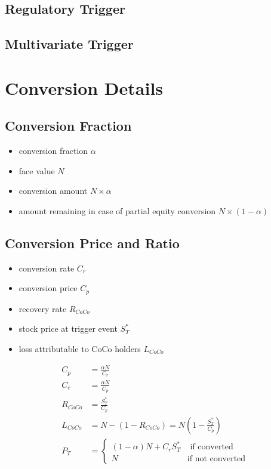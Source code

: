 \subsection{Regulatory Trigger}

\subsection{Multivariate Trigger}

\section{Conversion Details}

\subsection{Conversion Fraction}

\begin{itemize}
    \item conversion fraction $\alpha$
    \item face value $N$
    \item conversion amount $N \times \alpha$
    \item amount remaining in case of partial equity conversion $N \times (1-\alpha)$
\end{itemize}

\subsection{Conversion Price and Ratio}
\begin{itemize}
    \item conversion rate $C_r$
    \item conversion price $C_p$
    \item recovery rate $R_{CoCo}$
    \item stock price at trigger event $S_T^{*}$
    \item loss attributable to CoCo holders $L_{CoCo}$
\end{itemize}

\begin{align}
    C_p &= \frac{\alpha N}{C_r}\\
    C_r &= \frac{\alpha N}{C_p}\\
    R_{CoCo} &= \frac{S_T^{*} }{C_p}\\
    L_{CoCo} &= N - ( 1 - R_{CoCo}) = N \left( 1 - \frac{S_T^{*}}{C_p} \right)\\
    P_T &= \begin{cases} (1 - \alpha) N + C_r S_T^{*} & \text{ if converted} \\ N & \text{if not converted} \end{cases}
\end{align}

